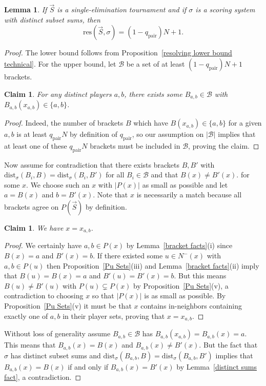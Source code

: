 \documentclass[12pt,letterpaper]{article}
\newtheorem{lem}[thm]{Lemma}
\newtheorem{claim}[thm]{Claim}
\theoremstyle{definition}
\newcommand{\sig}{\sigma}
\renewcommand{\1}{\mathbbm{1}}
\renewcommand{\c}[1]{\mathcal{#1}}
\newcommand{\dist}{\mathrm{dist}}
\newcommand{\tour}{\vec{S}}
\newcommand{\res}{\mathrm{res}}
\begin{document}
\begin{lem}\label{tight resolving}
	If $\tour$ is a single-elimination tournament and if $\sig$ is a scoring system with distinct subset sums, then
	\[\res(\tour,\sig)=(1-q_{\mathrm{pair}})N+1.\]
\end{lem}
\begin{proof}
	The lower bound follows from Proposition~\ref{resolving lower bound technical}.  For the upper bound, let $\c{B}$ be a set of at least $(1-q_{\mathrm{pair}})N+1$ brackets.
	\begin{claim}
		For any distinct players $a,b$, there exists some $B_{a,b}\in \c{B}$ with $B_{a,b}(x_{a,b})\in \{a,b\}$.
	\end{claim}
	\begin{proof}
		Indeed, the number of brackets $B$ which have $B(x_{a,b})\in \{a,b\}$ for a given $a,b$ is at least $q_{\mathrm{pair}}N$ by definition of $q_{\mathrm{pair}}$, so our assumption on $|\c{B}|$ implies that at least one of these $q_{\mathrm{pair}}N$ brackets must be included in $\c{B}$, proving the claim.
	\end{proof}
	Now assume for contradiction that there exists brackets $B,B'$ with $\dist_\sig(B_i,B)= \dist_\sig(B_i,B')$ for all $B_i\in \c{B}$ and that $B(x)\ne B'(x)$.   for some $x$.  We choose such an $x$ with $|P(x)|$ as small as possible and let $a=B(x)$ and $b=B'(x)$.  Note that $x$ is necessarily a match because all brackets agree on $P(\tour)$ by definition.
	\begin{claim}
		We have $x=x_{a,b}$.
	\end{claim}
	\begin{proof}
		We certainly have $a,b\in P(x)$ by Lemma~\ref{bracket facts}(i) since $B(x)=a$ and $B'(x)=b$.  If there existed some $u\in N^-(x)$ with $a,b\in P(u)$ then Proposition~\ref{Pu Sets}(iii) and Lemma~\ref{bracket facts}(ii) imply that $B(u)=B(x)=a$ and $B'(u)=B'(x)=b$.  But this means $B(u)\ne B'(u)$ with $P(u)\subsetneq P(x)$ by Proposition~\ref{Pu Sets}(v), a contradiction to choosing $x$ so that $|P(x)|$ is as small as possible.  By Proposition~\ref{Pu Sets}(v) it must be that $x$ contains in-neighbors containing exactly one of $a,b$ in their player sets, proving that $x=x_{a,b}$.
	\end{proof}
	Without loss of generality assume $B_{a,b}\in \c{B}$ has $B_{a,b}(x_{a,b})=B_{a,b}(x)=a$.  This means that $B_{a,b}(x)=B(x)$ and $B_{a,b}(x)\ne B'(x)$.  But the fact that $\sig$ has distinct subset sums and $\dist_\sig(B_{a,b},B)=\dist_\sig(B_{a,b},B')$ implies that $B_{a,b}(x)=B(x)$ if and only if $B_{a,b}(x)=B'(x)$ by Lemma~\ref{distinct sums fact}, a contradiction.
\end{proof}
\end{document}
